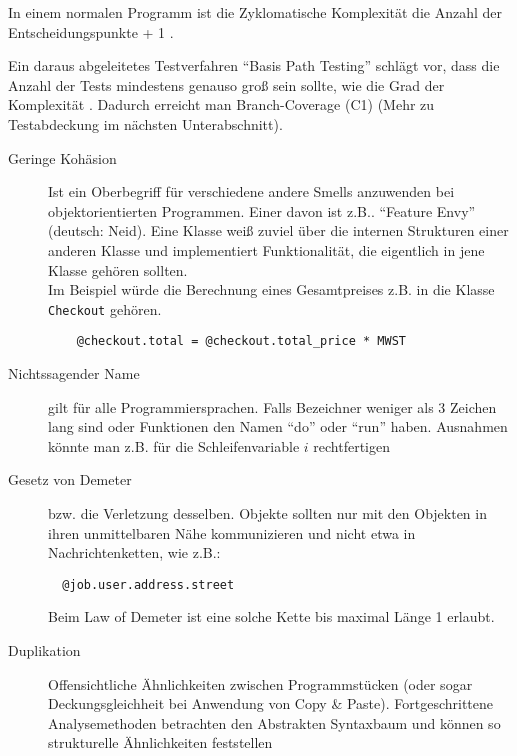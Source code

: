 
In einem normalen Programm ist die Zyklomatische Komplexität die Anzahl der Entscheidungspunkte + 1 \citep[S. 314]{mccabe_complexity_1976}.

Ein daraus abgeleitetes Testverfahren "`Basis Path Testing"' schlägt vor, dass die Anzahl der Tests mindestens genauso groß sein sollte, wie die Grad der Komplexität \citep[S. 318]{mccabe_complexity_1976}. Dadurch erreicht man Branch-Coverage (C1) (Mehr zu Testabdeckung im nächsten Unterabschnitt).


\begin{description}
 \item[Geringe Kohäsion] Ist ein Oberbegriff für verschiedene andere Smells anzuwenden bei objektorientierten Programmen. Einer davon ist z.B.. "`Feature Envy"' (deutsch: Neid). Eine Klasse weiß zuviel über die internen Strukturen einer anderen Klasse und implementiert Funktionalität, die eigentlich in jene Klasse gehören sollten. \\
 Im Beispiel würde die Berechnung eines Gesamtpreises z.B. in die Klasse \texttt{Checkout} gehören.
 \begin{lstlisting}
    @checkout.total = @checkout.total_price * MWST
 \end{lstlisting}
 \item[Nichtssagender Name] gilt für alle Programmiersprachen. Falls Bezeichner weniger als 3 Zeichen lang sind oder Funktionen den Namen "`do"' oder "`run"' haben. Ausnahmen könnte man z.B. für die Schleifenvariable $i$ rechtfertigen
 \item[Gesetz von Demeter] bzw. die Verletzung desselben. Objekte sollten nur mit den Objekten in ihren unmittelbaren Nähe kommunizieren und nicht etwa in Nachrichtenketten, wie z.B.:
 \begin{lstlisting}
  @job.user.address.street
 \end{lstlisting}
 Beim Law of Demeter ist eine solche Kette bis maximal Länge 1 erlaubt.
 \item[Duplikation] Offensichtliche Ähnlichkeiten zwischen Programmstücken (oder sogar Deckungsgleichheit bei Anwendung von Copy \& Paste). Fortgeschrittene Analysemethoden betrachten den Abstrakten Syntaxbaum und können so strukturelle Ähnlichkeiten feststellen
 \end{description}

